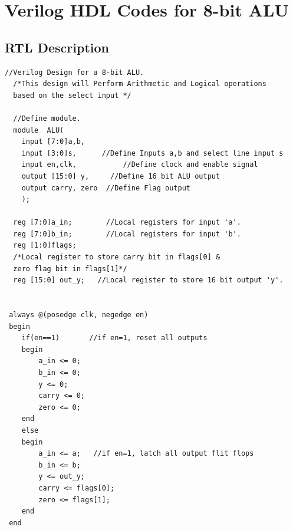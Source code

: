 \documentclass[12pt,singleside,a4paper]{article}
\begin{document}
\newpage
\section{Verilog HDL Codes for 8-bit ALU}


\subsection{RTL Description}
\begin{lstlisting}[style=verilog-style]
  //Verilog Design for a 8-bit ALU.
  /*This design will Perform Arithmetic and Logical operations 
  based on the select input */

  //Define module.
  module  ALU(
	input [7:0]a,b,
	input [3:0]s,      //Define Inputs a,b and select line input s
	input en,clk,		    //Define clock and enable signal
	output [15:0] y,     //Define 16 bit ALU output
	output carry, zero  //Define Flag output
	);
	
  reg [7:0]a_in;	    //Local registers for input 'a'.
  reg [7:0]b_in;	    //Local registers for input 'b'.
  reg [1:0]flags;	    
  /*Local register to store carry bit in flags[0] &
  zero flag bit in flags[1]*/
  reg [15:0] out_y;   //Local register to store 16 bit output 'y'.


 always @(posedge clk, negedge en)
 begin
    if(en==1)		//if en=1, reset all outputs
    begin
        a_in <= 0;
        b_in <= 0;
        y <= 0;
        carry <= 0;
        zero <= 0;
    end
    else
    begin
        a_in <= a;   //if en=1, latch all output flit flops
        b_in <= b;
        y <= out_y;
        carry <= flags[0];
        zero <= flags[1];
    end
 end
 

 \end{lstlisting}
 \newpage
\end{document}
